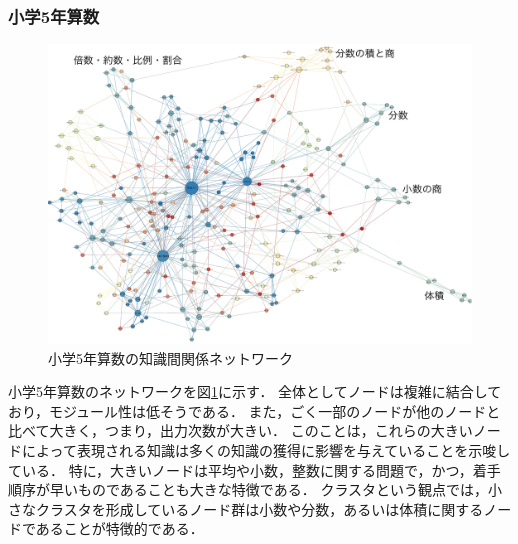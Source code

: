 \subsubsection{小学5年算数}
\begin{figure}[!htb]
\begin{center}
	\includegraphics[width=330pt]{./img/s5_mat_label2.pdf}
	\caption{小学5年算数の知識間関係ネットワーク}
	\label{fig:net_s5mat}
\end{center}
\end{figure}
小学5年算数のネットワークを図\ref{fig:net_s5mat}に示す．
全体としてノードは複雑に結合しており，モジュール性は低そうである．
また，ごく一部のノードが他のノードと比べて大きく，つまり，出力次数が大きい．
このことは，これらの大きいノードによって表現される知識は多くの知識の獲得に影響を与えていることを示唆している．
特に，大きいノードは平均や小数，整数に関する問題で，かつ，着手順序が早いものであることも大きな特徴である．
クラスタという観点では，小さなクラスタを形成しているノード群は小数や分数，あるいは体積に関するノードであることが特徴的である．



